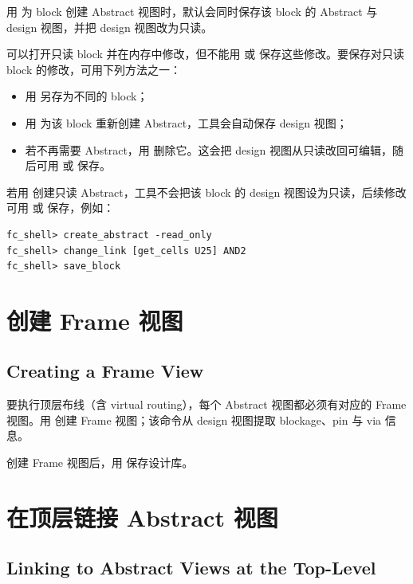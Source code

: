 用  为 block 创建 Abstract 视图时，默认会同时保存该 block 的 Abstract 与 design 视图，并把 design 视图改为只读。

可以打开只读 block 并在内存中修改，但不能用  或  保存这些修改。要保存对只读 block 的修改，可用下列方法之一：
\begin{itemize}
  \item 用  另存为不同的 block；
  \item 用  为该 block 重新创建 Abstract，工具会自动保存 design 视图；
  \item 若不再需要 Abstract，用  删除它。这会把 design 视图从只读改回可编辑，随后可用  或  保存。
\end{itemize}

若用  创建只读 Abstract，工具不会把该 block 的 design 视图设为只读，后续修改可用  或  保存，例如：
\begin{lstlisting}
fc_shell> create_abstract -read_only
fc_shell> change_link [get_cells U25] AND2
fc_shell> save_block
\end{lstlisting}

\section{创建 Frame 视图}
\subsection*{Creating a Frame View}

要执行顶层布线（含 virtual routing），每个 Abstract 视图都必须有对应的 Frame 视图。用  创建 Frame 视图；该命令从 design 视图提取 blockage、pin 与 via 信息。

创建 Frame 视图后，用  保存设计库。

\section{在顶层链接 Abstract 视图}
\subsection*{Linking to Abstract Views at the Top-Level}

